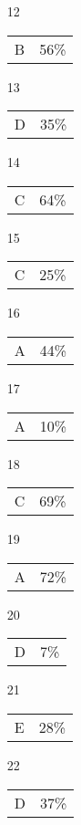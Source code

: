 \documentclass{article}
\begin{document}
\begin{multicols}{4}
\begin{enumerate}
    \item[12] \begin{tabular}{cc} B & 56\%\end{tabular}
    
    \item[13] \begin{tabular}{cc} D & 35\%\end{tabular}
    
    \item[14] \begin{tabular}{cc} C & 64\%\end{tabular}
    
    \item[15] \begin{tabular}{cc} C & 25\%\end{tabular}
    
       \item[]
    
    \item[16] \begin{tabular}{cc} A & 44\%\end{tabular}
    
    \item[17] \begin{tabular}{cc} A & 10\%\end{tabular}
    
    \item[18] \begin{tabular}{cc} C & 69\%\end{tabular}
    
    \item[19] \begin{tabular}{cc} A & 72\%\end{tabular}
    
    \item[20] \begin{tabular}{cc} D & 7\%\end{tabular}
    
       \item[]
    
    \item[21] \begin{tabular}{cc} E & 28\%\end{tabular}
    
    \item[22] \begin{tabular}{cc} D & 37\%\end{tabular}
    

\end{enumerate}
\end{multicols}
\end{document}
